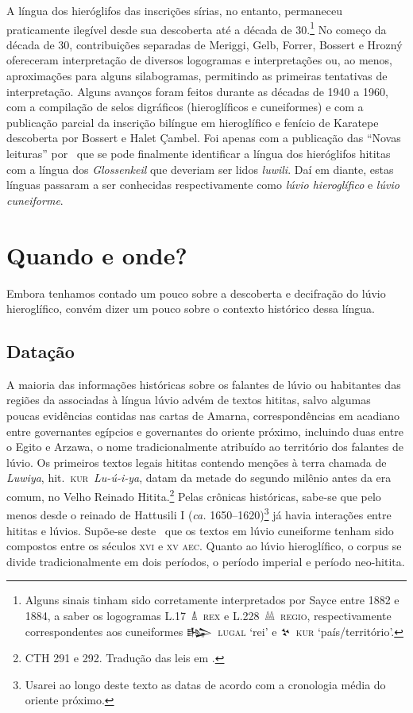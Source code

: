 A língua dos hieróglifos das inscrições sírias, no entanto, permaneceu
praticamente ilegível desde sua descoberta até a década de 30.\footnote{Alguns
	sinais tinham sido corretamente interpretados por Sayce entre 1882 e 1884, a
	saber os logogramas \mbox{L.17 𔐑 \textsc{rex}} e \mbox{L.228 𔔆 \textsc{regio}},
	respectivamente correspondentes aos cuneiformes
	\mbox{\foreignlanguage{hittite}{𒈗} \textsc{lugal}} `rei' e \mbox{\foreignlanguage{hittite}{𒆳} \textsc{kur}}
	`país\slash{}território'.}
No começo da década de 30, contribuições separadas de Meriggi, Gelb, Forrer,
Bossert e Hrozný ofereceram interpretação de diversos logogramas e
interpretações ou, ao menos, aproximações para alguns silabogramas,
permitindo as primeiras tentativas de interpretação.
Alguns avanços foram feitos durante as décadas de 1940 a 1960, com a compilação
de selos digráficos (hieroglíficos e cuneiformes) e com a publicação parcial da
inscrição bilíngue em hieroglífico e fenício de Karatepe descoberta por
Bossert e Halet Çambel.
Foi apenas com a publicação das ``Novas leituras''
por~\textcite{HawkinsMorpurgoNeumann1974} que se pode finalmente identificar a
língua dos hieróglifos hititas com a língua dos
\emph{\foreignlanguage{german}{Glossenkeil}} que deveriam
ser lidos \emph{luwili}.
Daí em diante, estas línguas passaram a ser conhecidas respectivamente como
\emph{lúvio hieroglífico} e \emph{lúvio cuneiforme}.

\section{Quando e onde?}

Embora tenhamos contado um pouco sobre a descoberta e decifração do lúvio
hieroglífico, convém dizer um pouco sobre o contexto histórico dessa língua.

\subsection{Datação}
A maioria das informações históricas sobre os falantes de lúvio ou habitantes
das regiões da associadas à língua lúvio advém de textos hititas, salvo algumas
poucas evidências contidas nas cartas de Amarna, correspondências em acadiano
entre governantes egípcios e governantes do oriente próximo, incluindo duas
entre o Egito e Arzawa, o nome tradicionalmente atribuído ao território dos
falantes de lúvio.
Os primeiros textos legais hititas contendo menções à
terra chamada de \emph{Luwiya}, hit.\ \mbox{\textsc{kur} \textit{Lu-ú-i-ya}},
datam da metade do segundo milênio antes da era comum, no Velho Reinado
Hitita.\footnote{CTH 291 e 292. Tradução das leis em \textcite{Hoffner1997}.}
Pelas crônicas históricas, sabe-se que pelo menos desde o reinado de Hattusili I
(\emph{ca.} 1650--1620)\footnote{Usarei ao longo deste texto as datas de acordo
	com a cronologia média do oriente próximo.} já havia interações entre hititas
e lúvios.
Supõe-se deste~\textcite{Starke1985} que os textos em lúvio cuneiforme tenham
sido compostos entre os séculos \textsc{xvi} e \textsc{xv} \textsc{aec}.
Quanto ao lúvio hieroglífico, o corpus se divide tradicionalmente em dois
períodos, o período imperial e período neo-hitita.


